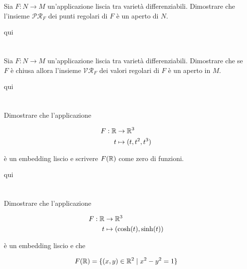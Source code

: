 \begin{tcolorbox}
	Sia $ F : N \to M $ un'applicazione liscia tra varietà differenziabili. Dimostrare che l'insieme $ \mathcal{PR}_{F} $ dei punti regolari di $ F $ è un aperto di $ N $.
\end{tcolorbox}

qui

%

\newpage

%

\section{}\label{es2-18}

\begin{tcolorbox}
		Sia $ F : N \to M $ un'applicazione liscia tra varietà differenziabili. Dimostrare che se $ F $ è chiusa allora  l'insieme $ \mathcal{VR}_{F} $ dei valori regolari di $ F $ è un aperto in $ M $.
\end{tcolorbox}

qui

%

\newpage

%

\section{}\label{es2-19}

\begin{tcolorbox}
	Dimostrare che l'applicazione
	
	\begin{align}
		\begin{split}
			F : \mathbb{R} &\to \mathbb{R}^{3}\\
			t &\mapsto (t,t^{2},t^{3})
		\end{split}
	\end{align}

	è un embedding liscio e scrivere $ F(\mathbb{R}) $ come zero di funzioni.
\end{tcolorbox}

qui

%

\newpage

%

\section{}\label{es2-20}

\begin{tcolorbox}
	Dimostrare che l'applicazione
	
	\begin{align}
		\begin{split}
			F : \mathbb{R} &\to \mathbb{R}^{3}\\
			t &\mapsto (\cosh(t),\sinh(t))
		\end{split}
	\end{align}
	
	è un embedding liscio e che
	
	\begin{equation}
		F(\mathbb{R}) = \{ (x,y) \in \mathbb{R}^{2} \mid x^{2}-y^{2} = 1 \}
	\end{equation}
\end{tcolorbox}

